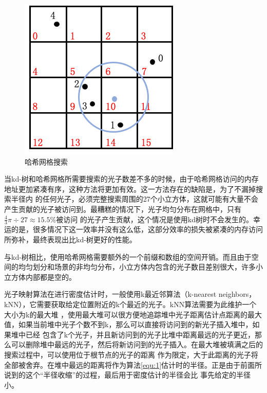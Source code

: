\documentclass[UTF8]{ctexart}
\begin{document}
        \begin{figure}[htbp]
        \centering
        \includegraphics[scale=0.6]{pic/HashGridSearch.png}
        \caption{哈希网格搜索}
        \label{fig:2}
        \end{figure}
        
        当kd-树和哈希网格所需要搜索的光子数差不多的时候，由于哈希网格访问的内存地址更加紧凑有序，这种方法将更加有效。这一方法存在的缺陷是，为了不漏掉搜索半径内
        的任何光子，必须完整搜索周围的27个小立方体，这就可能有大量不会产生贡献的光子被访问到。最糟糕的情况下，光子均匀分布在网格中，只有$\frac{4}{3}\pi\div27\approx15.5\%$被访问
        的光子产生贡献，这个情况是使用kd树时不会发生的。幸运的是，很多情况下这一效率并没有这么低，这部分效率的损失被紧凑的内存访问所弥补，最终表现出比kd-树更好的性能。
        
        与kd-树相比，使用哈希网格需要额外的一个前缀和数组的空间开销。而且由于空间的均匀划分和场景的非均匀分布，小立方体内包含的光子数目差别很大，许多小立方体内部都是空的。
        
        光子映射算法在进行密度估计时，一般使用k最近邻算法（k-nearest neighbors，kNN），它需要获取给定位置附近的k个最近的光子。kNN算法需要为此维护一个大小为k的最大堆
        \cite{jensen2000practical}，使用最大堆可以很方便地追踪堆中光子距离估计点距离的最大值，如果当前堆中光子个数不到k，那么可以直接将访问到的新光子插入堆中，如果堆中已经
        包含了k个光子，并且新访问到的光子比堆中距离最远的光子更近，那么可以删除堆中最远的光子，然后将新访问到的光子插入。在最大堆被填满之后的搜索过程中，可以使用位于根节点的光子的距离
        作为限定，大于此距离的光子将全部被舍弃。在堆中最远的距离将作为算法\ref{equ:1}估计时的半径。正是由于前面所说到的这个“半径收缩”的过程，最后用于密度估计的半径会比
        事先给定的半径小\cite{2003Photon}。
        
\end{document}

